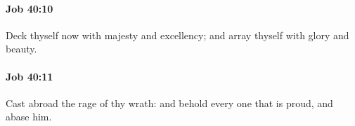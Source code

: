 		\paragraph{Job 40:10} %
			\label{JOB-40-10}

			Deck thyself now with majesty and excellency; and array thyself with glory and beauty.


		\paragraph{Job 40:11} %
			\label{JOB-40-11}

			Cast abroad the rage of thy wrath: and behold every one that is proud, and abase him.


